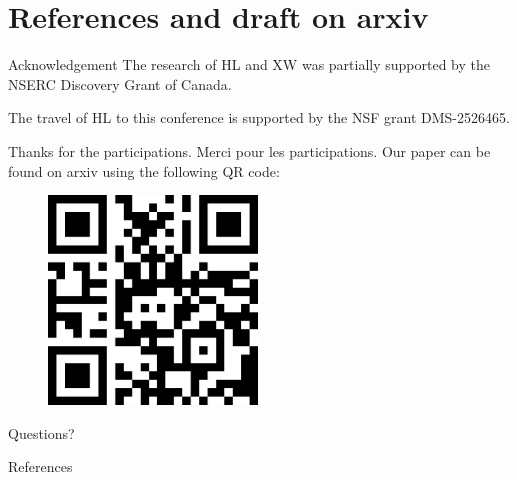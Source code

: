 \documentclass[11pt]{beamer}
\theoremstyle{definition}
\begin{document}
\section{References and draft on arxiv}
    \begin{frame}{Acknowledgement}
        The research of HL and XW was partially supported by the NSERC Discovery Grant of Canada.
        \par
        The travel of HL to this conference is supported by the NSF grant DMS-2526465.
    \end{frame}
    \begin{frame}{Thanks for the participations. Merci pour les participations.}
        Our paper can be found on arxiv using the following QR code: 
        \begin{figure}
            \centering
            \includegraphics[width=15em]{assets/paper-qrcode.png}
        \end{figure}
        Questions?
    \end{frame}
    \begin{frame}{References}        
        
    \end{frame}
\end{document}
